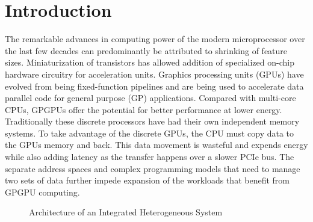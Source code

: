 \section{Introduction}\label{introduction}



\par The remarkable advances in computing power of the modern microprocessor over the last few decades can predominantly be attributed to shrinking of feature sizes. Miniaturization of transistors has allowed addition of specialized on-chip hardware circuitry for acceleration units. 
Graphics processing units (GPUs) have evolved from being fixed-function pipelines and are being used to accelerate data parallel code for general purpose (GP) applications. Compared with multi-core CPUs, GPGPUs offer the potential for better performance at lower energy. Traditionally these discrete processors have had their own independent memory systems. To take advantage of the discrete GPUs, the CPU must copy data to the GPUs memory and back. This data movement is wasteful and expends energy while also adding latency as the transfer happens over a slower PCIe bus. The separate address spaces and complex programming models that need to manage two sets of data further impede expansion of the workloads that benefit from GPGPU computing. 
\begin{figure}[!htb]
    \centering
    \def\svgwidth{0.9\columnwidth}
    
    \caption{Architecture of an Integrated Heterogeneous System}
    \label{fig:hsa-arch}
\end{figure}

